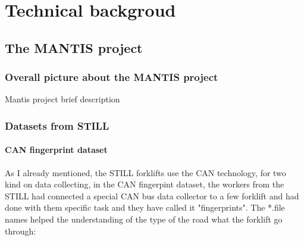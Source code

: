 \chapter{Technical backgroud}
	\section{The MANTIS project}
		\subsection{Overall picture about the MANTIS project}
Mantis project brief description

		\subsection{Datasets from STILL}
			\subsubsection{CAN fingerprint dataset}
				\noindent
As I already mentioned, the STILL forklifts use the CAN technology, for two kind on data collecting, in the CAN fingerpint dataset, the workers from the STILL had  connected a special CAN bus data collector to a few forklift and had done with them specific task and they have called it "fingerprints". The *.file names helped the understanding of the type of the road what the forklift go through:


